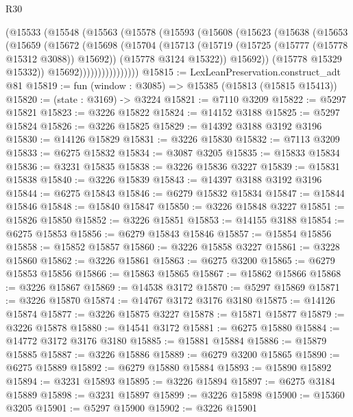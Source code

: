 \begin{lexlean}{R30}
\begin{coremodule}
                (@15533
                  (@15548
                    (@15563
                      (@15578
                        (@15593
                          (@15608
                            (@15623
                              (@15638
                                (@15653
                                  (@15659
                                    (@15672
                                      (@15698
                                        (@15704
                                          (@15713
                                            (@15719 (@15725 (@15777 (@15778 @15312 @3088)) @15692))
                                            (@15778 @3124 @15322))
                                          @15692))
                                      (@15778 @15329 @15332))
                                    @15692))))))))))))))))
@15815 := LexLeanPreservation.construct_adt @81
@15819 := fun (window : @3085) => @15385 (@15813 (@15815 @15413))
@15820 := (state : @3169) -> @3224
@15821 := @7110 @3209
@15822 := @5297 @15821
@15823 := @3226 @15822
@15824 := @14152 @3188
@15825 := @5297 @15824
@15826 := @3226 @15825
@15829 := @14392 @3188 @3192 @3196
@15830 := @14126 @15829
@15831 := @3226 @15830
@15832 := @7113 @3209
@15833 := @6275 @15832
@15834 := @3087 @3205
@15835 := @15833 @15834
@15836 := @3231 @15835
@15838 := @3226 @15836 @3227
@15839 := @15831 @15838
@15840 := @3226 @15839
@15843 := @14397 @3188 @3192 @3196
@15844 := @6275 @15843
@15846 := @6279 @15832 @15834
@15847 := @15844 @15846
@15848 := @15840 @15847
@15850 := @3226 @15848 @3227
@15851 := @15826 @15850
@15852 := @3226 @15851
@15853 := @14155 @3188
@15854 := @6275 @15853
@15856 := @6279 @15843 @15846
@15857 := @15854 @15856
@15858 := @15852 @15857
@15860 := @3226 @15858 @3227
@15861 := @3228 @15860
@15862 := @3226 @15861
@15863 := @6275 @3200
@15865 := @6279 @15853 @15856
@15866 := @15863 @15865
@15867 := @15862 @15866
@15868 := @3226 @15867
@15869 := @14538 @3172
@15870 := @5297 @15869
@15871 := @3226 @15870
@15874 := @14767 @3172 @3176 @3180
@15875 := @14126 @15874
@15877 := @3226 @15875 @3227
@15878 := @15871 @15877
@15879 := @3226 @15878
@15880 := @14541 @3172
@15881 := @6275 @15880
@15884 := @14772 @3172 @3176 @3180
@15885 := @15881 @15884
@15886 := @15879 @15885
@15887 := @3226 @15886
@15889 := @6279 @3200 @15865
@15890 := @6275 @15889
@15892 := @6279 @15880 @15884
@15893 := @15890 @15892
@15894 := @3231 @15893
@15895 := @3226 @15894
@15897 := @6275 @3184 @15889
@15898 := @3231 @15897
@15899 := @3226 @15898
@15900 := @15360 @3205
@15901 := @5297 @15900
@15902 := @3226 @15901

\end{coremodule}
\end{lexlean}
